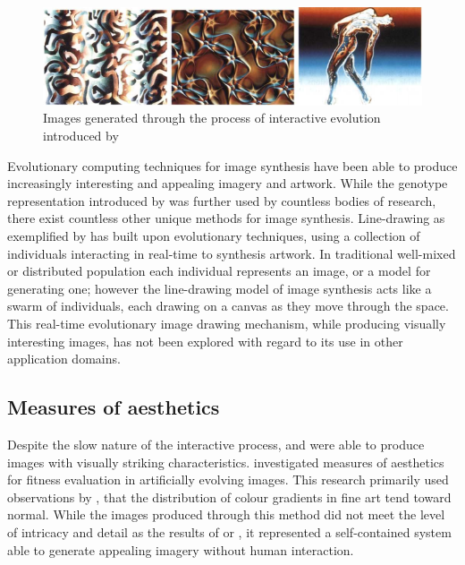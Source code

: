 \documentclass{article}
\begin{document}
\begin{figure}[h!]
	\includegraphics[width=\textwidth]{images/sims-interactive-image-generation.png}
	\caption{Images generated through the process of interactive evolution introduced by \citet{sims}}
	\label{fig:sims}
\end{figure}

Evolutionary computing techniques for image synthesis have been able to produce increasingly interesting and appealing imagery and artwork.
While the genotype representation introduced by \citet{sims} was further used by countless bodies of research, there exist countless other unique methods for image synthesis.
Line-drawing as exemplified by \citet{niche-reproduction} has built upon evolutionary techniques, using a collection of individuals interacting in real-time to synthesis artwork.
In traditional well-mixed \citep{sims} or distributed population \citep{distributed-evolutionary-art} each individual represents an image, or a model for generating one; however the line-drawing model of image synthesis acts like a swarm of individuals, each drawing on a canvas as they move through the space.
This real-time evolutionary image drawing mechanism, while producing visually interesting images, has not been explored with regard to its use in other application domains.


\subsection{Measures of aesthetics}

Despite the slow nature of the interactive process, \citet{sims} and \citet{nevar} were able to produce images with visually striking characteristics.
\citet{aesthetic-measures} investigated measures of aesthetics for fitness evaluation in artificially evolving images.
This research primarily used observations by \citet{ralph-bell-curve}, that the distribution of colour gradients in fine art tend toward normal.
While the images produced through this method did not meet the level of intricacy and detail as the results of \citet{sims} or \citet{nevar}, it represented a self-contained system able to generate appealing imagery without human interaction.
\end{document}
